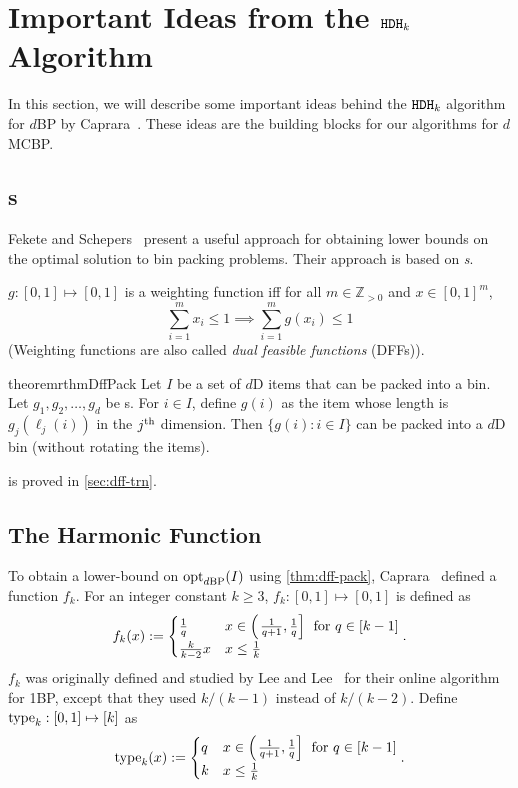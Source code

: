 \section{Important Ideas from the \texorpdfstring{$\operatorname{\mathtt{HDH}}_{k}$}{HDHk} Algorithm}
\label{sec:hdhk-prelims}

In this section, we will describe some important ideas behind the $\operatorname{\mathtt{HDH}}_{k}$ algorithm
for $d$BP by Caprara~\cite{caprara2008}.
These ideas are the building blocks for our algorithms for $d$MCBP.

\subsection{\DFF{}s}

Fekete and Schepers~\cite{fekete2004} present a useful approach for
obtaining lower bounds on the optimal solution to bin packing problems.
Their approach is based on \emph{\dff{}s}.

\begin{definition}
$g: [0, 1] \mapsto [0, 1]$ is a weighting function iff
for all $m \in \mathbb{Z}_{>0}$ and $x \in [0, 1]^m$,
\[ \sum_{i=1}^m x_i \le 1 \implies \sum_{i=1}^m g(x_i) \le 1 \]
(Weighting functions are also called \emph{dual feasible functions} (DFFs)).
\end{definition}

\begin{restatable}{theorem}{rthmDffPack}
\label{thm:dff-pack}
Let $I$ be a set of $d$D items that can be packed into a bin.
Let $g_1, g_2, \ldots, g_d$ be \dff{}s.
For $i \in I$, define $g(i)$ as the item whose length is $g_j(\ell_j(i))$ in the $j^{\textrm{th}}$ dimension.
Then $\{g(i): i \in I\}$ can be packed into a $d$D bin (without rotating the items).
\end{restatable}
 is proved in \cref{sec:dff-trn}.

\subsection{The Harmonic Function}
\label{sec:hdhk-prelims:harmonic}

To obtain a lower-bound on $\operatorname{opt}_{d\mathrm{BP}}(I)$ using \cref{thm:dff-pack},
Caprara~\cite{caprara2008} defined a function $f_k$.
For an integer constant $k \ge 3$, $f_k: [0, 1] \mapsto [0, 1]$ is defined as
\[ f_k(x) := \begin{cases}
\frac{1}{q} & x \in \left(\left.\frac{1}{q+1}, \frac{1}{q}\right]\right. \textrm{ for } q \in [k-1]
\\ \frac{k}{k-2}x & x \le \frac{1}{k} \end{cases}. \]
$f_k$ was originally defined and studied by Lee and Lee~\cite{leelee} for their
online algorithm for 1BP, except that they used $k/(k-1)$ instead of $k/(k-2)$.
Define $\operatorname{type}_k: [0, 1] \mapsto [k]$ as
\[ \operatorname{type}_k(x) := \begin{cases}
q & x \in \left(\left.\frac{1}{q+1}, \frac{1}{q}\right]\right. \textrm{ for } q \in [k-1]
\\ k & x \le \frac{1}{k} \end{cases}. \]

